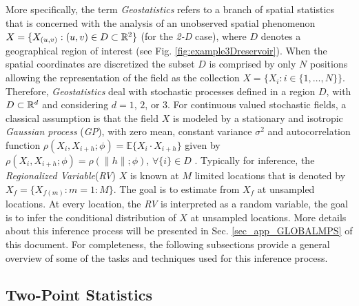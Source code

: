 More specifically, the term \emph{Geostatistics} refers to a branch of spatial statistics that is concerned with the analysis of an unobserved  spatial  phenomenon $X = \{X_{(u,v) } : (u,v) \in D \subset \mathbb{R}^2 \}$ (for the \emph{2-D} case), where $D$ denotes a geographical region of interest (see Fig. \ref{fig:example3Dreservoir}). When the spatial coordinates are discretized the subset $D$ is comprised by only $N$ positions allowing the representation of the field as the collection $X = \{X_{i} : i \in \{1,\ldots, N\} \}$. Therefore, \emph{Geostatistics} deal with stochastic processes defined in a region $D$, with $D \subset \mathbb{R}^d$ and considering $d= 1$, $2$, or $3$. For continuous valued stochastic fields, a classical assumption is that the field $X$ is modeled by a stationary and isotropic \emph{Gaussian process} (\emph{GP}), with zero mean, constant variance $\sigma^2$ and autocorrelation function $\rho(X_{i} , X_{i+h} ; \phi) = \mathds{E} \{ X_{i} \cdot X_{i + h}  \} $ given by $\rho(X_{i} , X_{i+h} ; \phi)=\rho(\parallel h \parallel;\phi)$, $\forall \{i\} \in D$ \citep{gaoetal1996, vangroenigenetal1999, Blackwell1998, abellan_2010a}. Typically for inference, the \emph{Regionalized Variable}(\emph{RV}) $X$ is known at $M$ limited locations that is denoted by $X_f = \{X_{f(m)} : m = 1:M \}$. The goal is to estimate from $X_f$ at unsampled locations. At every location, the \emph{RV} is interpreted as a random variable, the goal is to infer the conditional distribution of $X$ at unsampled locations. More details about this inference process will be presented in Sec. \ref{sec_app_GLOBALMPS} of this document. For completeness, the following subsections provide a general overview of some of the tasks and techniques used for this inference process. 

\subsection{Two-Point Statistics}

